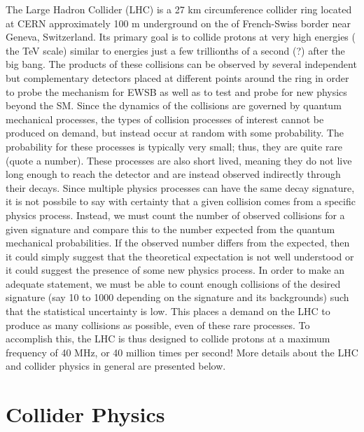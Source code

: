 



The Large Hadron Collider (LHC) \cite{lhc} is
a 27 km circumference collider ring
located at CERN approximately 100 m underground on the 
of French-Swiss border near Geneva, Switzerland.
Its primary goal is to collide protons at very high energies (
the TeV scale)  similar to energies just a few trillionths of a second (?)
after the big bang.  %
The products of these collisions can 
be observed
by several independent but complementary detectors placed at different
points around the ring in order to probe the mechanism
for EWSB as well as to test and probe for new physics beyond the SM.
Since the dynamics of the collisions are governed by quantum mechanical
processes, the types of collision processes of interest cannot be
produced on demand, but instead occur at random with some
probability.
The probability for these processes is typically very small; thus, they are quite
rare (quote a number).
These processes are also short lived, meaning they do not live long
enough to reach the detector and are instead observed indirectly through their
decays. Since multiple physics processes can have the same decay 
signature, it is not possbile to say with certainty that a given 
collision comes from a specific physics process. Instead, 
we must count the number of observed collisions for a given signature
and compare this to the number expected from the 
quantum mechanical probabilities.  If the observed number differs
from the expected, then it could simply suggest that the theoretical expectation
is not well understood or it could suggest the presence of some new physics
process.
In order to make an adequate statement, we must be able to count
enough collisions of the desired signature (say 10 to 1000 depending on the
signature and its backgrounds) 
such that the statistical uncertainty is low.  This places a demand
on the LHC to produce as many collisions as possible, even of these rare
processes. To accomplish this, the LHC is thus designed to collide
protons at a maximum frequency of 40 MHz, or 40 million times per second!
More details about the LHC and collider physics in general are presented
below.



\section{Collider Physics}
\label{sec:lhc_collider_physics}

